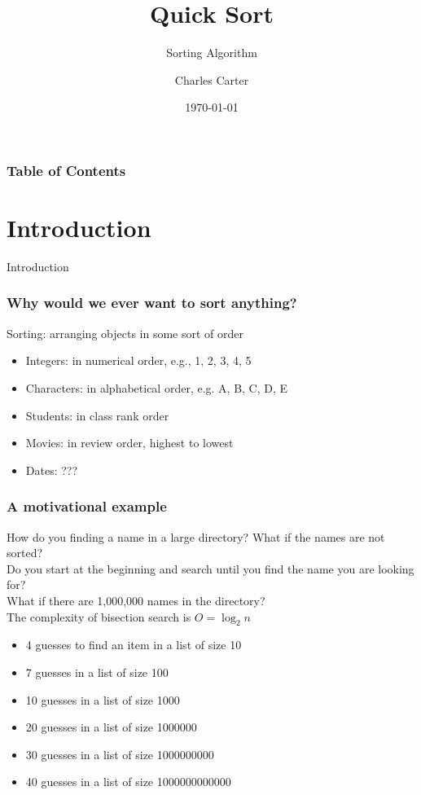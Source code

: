 \documentclass{beamer}
\title{Quick Sort}
\subtitle{Sorting Algorithm}
\author{Charles Carter}
\institute{Auburn University}
\date{\today}
\begin{document}
\frame{\titlepage}

\begin{frame}
\frametitle{Table of Contents}
\tableofcontents
\end{frame}

\section{Introduction}
\begin{frame}
    \LARGE Introduction
\end{frame}

    \begin{frame}
        \frametitle{Why would we ever want to sort anything?}
        \LARGE Sorting: arranging objects in some sort of order
        \normalsize
        \begin{itemize}
            \item Integers: in numerical order, e.g., 1, 2, 3, 4, 5
            \item Characters: in alphabetical order, e.g. A, B, C, D, E
            \item Students: in class rank order
            \item Movies: in review order, highest to lowest
            \item Dates: ???
        \end{itemize}
    \end{frame}

    \begin{frame}
        \frametitle{A motivational example}
        \Large How do you finding a name in a large directory?
        \normalsize
        What if the names are not sorted?\\
        Do you start at the beginning and search until you find the name you are looking for?\\
        What if there are 1,000,000 names in the directory?\\
        The complexity of bisection search is $O = \log_2 n$
        \begin{itemize}
            \item 4 guesses to find an item in a list of size 10
            \item 7 guesses  in a list of size 100
            \item 10 guesses  in a list of size 1000
            \item 20 guesses  in a list of size 1000000
            \item 30 guesses  in a list of size 1000000000
            \item 40 guesses  in a list of size 1000000000000
        \end{itemize}
    \end{frame}
\end{document}
